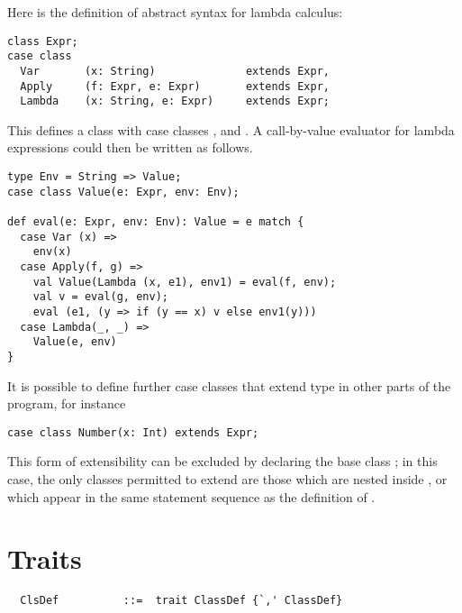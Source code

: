 \documentclass[a4paper,12pt,twoside,titlepage]{book}
\begin{document}
\example Here is the definition of abstract syntax for lambda
calculus:

\begin{lstlisting}
class Expr;
case class
  Var       (x: String)              extends Expr,
  Apply     (f: Expr, e: Expr)       extends Expr,
  Lambda    (x: String, e: Expr)     extends Expr;
\end{lstlisting}
This defines a class  with case classes
,  and . A call-by-value evaluator for lambda
expressions could then be written as follows.

\begin{lstlisting}
type Env = String => Value;
case class Value(e: Expr, env: Env);

def eval(e: Expr, env: Env): Value = e match {
  case Var (x) =>
    env(x)
  case Apply(f, g) =>
    val Value(Lambda (x, e1), env1) = eval(f, env);
    val v = eval(g, env);
    eval (e1, (y => if (y == x) v else env1(y)))
  case Lambda(_, _) =>
    Value(e, env)
}
\end{lstlisting}

It is possible to define further case classes that extend type
 in other parts of the program, for instance
\begin{lstlisting}
case class Number(x: Int) extends Expr;
\end{lstlisting}

This form of extensibility can be excluded by declaring the base class
 ; in this case, the only classes permitted to
extend  are those which are nested inside , or
which appear in the same statement sequence as the definition of
.

\section{Traits}

\label{sec:traits}

\syntax\begin{lstlisting}
  ClsDef          ::=  trait ClassDef {`,' ClassDef}
\end{lstlisting}
\end{document}
